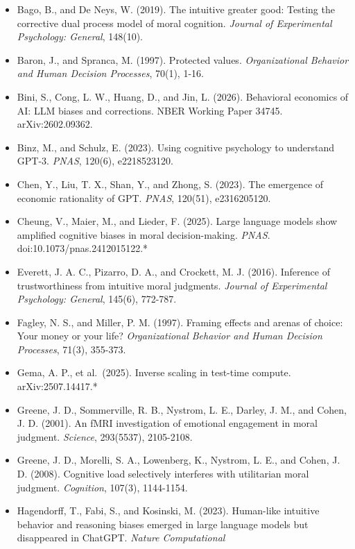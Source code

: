 \documentclass[
  11pt,
]{article}
\providecommand{\tightlist}{%
  \setlength{\itemsep}{0pt}\setlength{\parskip}{0pt}}
\begin{document}
\begin{itemize}
\tightlist
\item
  Bago, B., and De Neys, W. (2019). The intuitive greater good: Testing
  the corrective dual process model of moral cognition. \emph{Journal of
  Experimental Psychology: General}, 148(10).
\item
  Baron, J., and Spranca, M. (1997). Protected values.
  \emph{Organizational Behavior and Human Decision Processes}, 70(1),
  1-16.
\item
  Bini, S., Cong, L. W., Huang, D., and Jin, L. (2026). Behavioral
  economics of AI: LLM biases and corrections. NBER Working Paper 34745.
  arXiv:2602.09362.
\item
  Binz, M., and Schulz, E. (2023). Using cognitive psychology to
  understand GPT-3. \emph{PNAS}, 120(6), e2218523120.
\item
  Chen, Y., Liu, T. X., Shan, Y., and Zhong, S. (2023). The emergence of
  economic rationality of GPT. \emph{PNAS}, 120(51), e2316205120.
\item
  Cheung, V., Maier, M., and Lieder, F. (2025). Large language models
  show amplified cognitive biases in moral decision-making. \emph{PNAS}.
  doi:10.1073/pnas.2412015122.*
\item
  Everett, J. A. C., Pizarro, D. A., and Crockett, M. J. (2016).
  Inference of trustworthiness from intuitive moral judgments.
  \emph{Journal of Experimental Psychology: General}, 145(6), 772-787.
\item
  Fagley, N. S., and Miller, P. M. (1997). Framing effects and arenas of
  choice: Your money or your life? \emph{Organizational Behavior and
  Human Decision Processes}, 71(3), 355-373.
\item
  Gema, A. P., et al.~(2025). Inverse scaling in test-time compute.
  arXiv:2507.14417.*
\item
  Greene, J. D., Sommerville, R. B., Nystrom, L. E., Darley, J. M., and
  Cohen, J. D. (2001). An fMRI investigation of emotional engagement in
  moral judgment. \emph{Science}, 293(5537), 2105-2108.
\item
  Greene, J. D., Morelli, S. A., Lowenberg, K., Nystrom, L. E., and
  Cohen, J. D. (2008). Cognitive load selectively interferes with
  utilitarian moral judgment. \emph{Cognition}, 107(3), 1144-1154.
\item
  Hagendorff, T., Fabi, S., and Kosinski, M. (2023). Human-like
  intuitive behavior and reasoning biases emerged in large language
  models but disappeared in ChatGPT. \emph{Nature Computational
}
\end{itemize}
\end{document}

